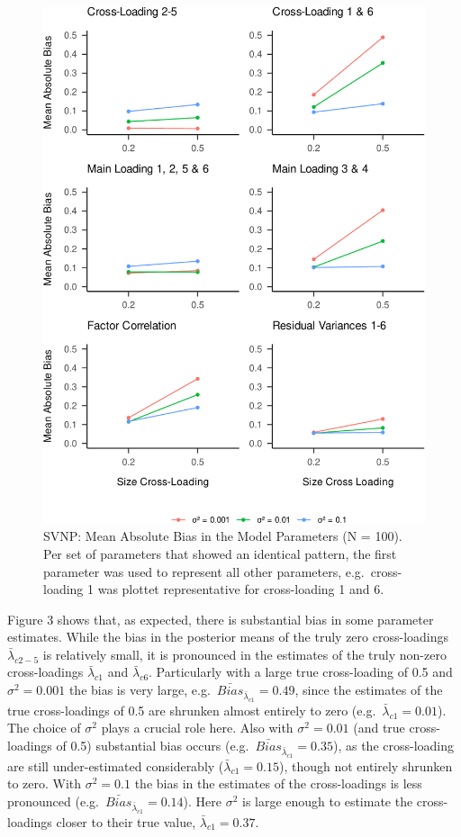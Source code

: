 \documentclass[
  man, donotrepeattitle,floatsintext]{apa6}
\begin{document}
\begin{figure}
\centering
\includegraphics{JMBKoch_thesis_files/figure-latex/unnamed-chunk-3-1.pdf}
\caption{\label{fig:unnamed-chunk-3}SVNP: Mean Absolute Bias in the Model Parameters (N = 100). Per set of parameters that showed an identical pattern, the first parameter was used to represent all other parameters, e.g.~cross-loading 1 was plottet representative for cross-loading 1 and 6.}
\end{figure}

Figure 3 shows that, as expected, there is substantial bias in some parameter estimates. While the bias in the posterior means of the truly zero cross-loadings \(\bar{\lambda}_{c 2-5}\) is relatively small, it is pronounced in the estimates of the truly non-zero cross-loadings \(\bar{\lambda}_{c 1}\) and \(\bar{\lambda}_{c 6}\). Particularly with a large true cross-loading of 0.5 and \(\sigma^2 = 0.001\) the bias is very large, e.g.~\(\bar{Bias}_{\bar{\lambda}_{c 1}} = 0.49\), since the estimates of the true cross-loadings of 0.5 are shrunken almost entirely to zero (e.g.~\(\bar{\lambda}_{c 1} = 0.01\)). The choice of \(\sigma^2\) plays a crucial role here. Also with \(\sigma^2 = 0.01\) (and true cross-loadings of 0.5) substantial bias occurs (e.g.~\(\bar{Bias}_{\bar{\lambda}_{c 1}} = 0.35\)), as the cross-loading are still under-estimated considerably (\(\bar{\lambda}_{c 1} = 0.15\)), though not entirely shrunken to zero. With \(\sigma^2 = 0.1\) the bias in the estimates of the cross-loadings is less pronounced (e.g.~\(\bar{Bias}_{\bar{\lambda}_{c 1}} = 0.14\)). Here \(\sigma^2\) is large enough to estimate the cross-loadings closer to their true value, \(\bar{\lambda}_{c 1} = 0.37\).
\end{document}
